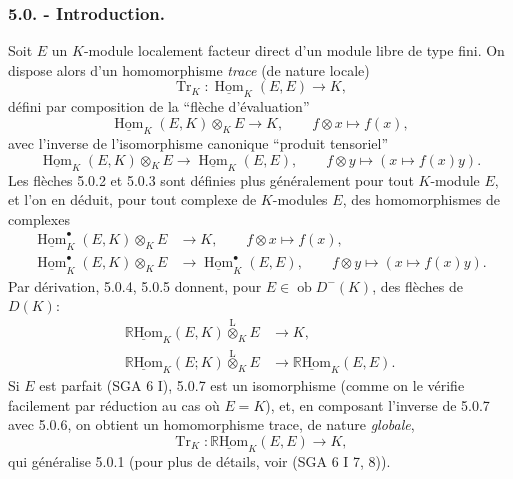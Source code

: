 \documentclass[11pt]{article}
\DeclareMathOperator{\Hom}{Hom}
\newcommand{\R}{\mathbb{R}}\newcommand{\RHomCore}{\mathbb{R}\mathrm{Hom}}
\newcommand{\ob}{\operatorname{ob}}
\providecommand{\RHom}{\RHomCore}
\providecommand{\uRHom}{\underline{\RHom}}
\providecommand{\uHom}{\underline{\Hom}}
\providecommand{\Tr}{\operatorname{Tr}}
\providecommand{\Tr}{\operatorname{Tr}}
\providecommand{\lten}{\overset{\mathrm L}{\otimes}}
\providecommand{\Tr}{\operatorname{Tr}}
\providecommand{\RHom}{\RHomCore}
\providecommand{\Hom}{\operatorname{Hom}}
\providecommand{\ob}{\operatorname{ob}}
\providecommand{\lten}{\overset{\mathrm L}{\otimes}}
\providecommand{\RHom}{\R\mathcal{H}om}
\providecommand{\lten}{\overset{\mathrm L}{\otimes}}
\providecommand{\R}{\mathrm R}
\providecommand{\Tr}{\operatorname{Tr}}
\providecommand{\lten}{\overset{\mathrm L}{\otimes}}
\providecommand{\lten}{\overset{\mathrm L}{\otimes}}
\providecommand{\lten}{\overset{\mathrm L}{\otimes}}
\providecommand{\RHom}{\RHomCore}
\providecommand{\Hom}{\operatorname{Hom}}
\providecommand{\Tr}{\operatorname{Tr}}
\providecommand{\lten}{\overset{\mathrm L}{\otimes}}
\begin{document}
\subsubsection*{5.0. - Introduction.}

Soit $E$ un $K$-module localement facteur direct d'un module libre de type fini. On dispose alors d'un homomorphisme \emph{trace} (de nature locale)
\begin{equation}\tag{5.0.1}
\Tr_K:\uHom_K(E,E)\longrightarrow K,
\end{equation}
défini par composition de la ``flèche d'évaluation''
\begin{equation}\tag{5.0.2}
\uHom_K(E,K)\otimes_KE\longrightarrow K,\qquad f\otimes x\longmapsto f(x),
\end{equation}
avec l'inverse de l'isomorphisme canonique ``produit tensoriel''
\begin{equation}\tag{5.0.3}
\uHom_K(E,K)\otimes_KE\longrightarrow\uHom_K(E,E),\qquad f\otimes y\longmapsto (x\longmapsto f(x)y).
\end{equation}
Les flèches 5.0.2 et 5.0.3 sont définies plus généralement pour tout $K$-module $E$, et l'on en déduit, pour tout complexe de $K$-modules $E$, des homomorphismes de complexes
\begin{align}
\uHom_K^\bullet(E,K)\otimes_KE&\longrightarrow K,\qquad f\otimes x\longmapsto f(x),\tag{5.0.4}\\
\uHom_K^\bullet(E,K)\otimes_KE&\longrightarrow \uHom_K^\bullet(E,E),\qquad f\otimes y\longmapsto (x\longmapsto f(x)y).\tag{5.0.5}
\end{align}
Par dérivation, 5.0.4, 5.0.5 donnent, pour $E\in\ob D^-(K)$, des flèches de $D(K)$:
\begin{align}
\uRHom_K(E,K)\lten_KE&\longrightarrow K,\tag{5.0.6}\\
\uRHom_K(E;K)\lten_KE&\longrightarrow\uRHom_K(E,E).\tag{5.0.7}
\end{align}
Si $E$ est
parfait (SGA 6 I), 5.0.7 est un isomorphisme (comme on le vérifie facilement par réduction au cas où $E=K$), et, en composant l'inverse de 5.0.7 avec 5.0.6, on obtient un homomorphisme trace, de nature \emph{globale},
\begin{equation}\tag{5.0.8}
\Tr_K:\uRHom_K(E,E)\longrightarrow K,
\end{equation}
qui généralise 5.0.1 (pour plus de détails, voir (SGA 6 I 7, 8)).
\end{document}
